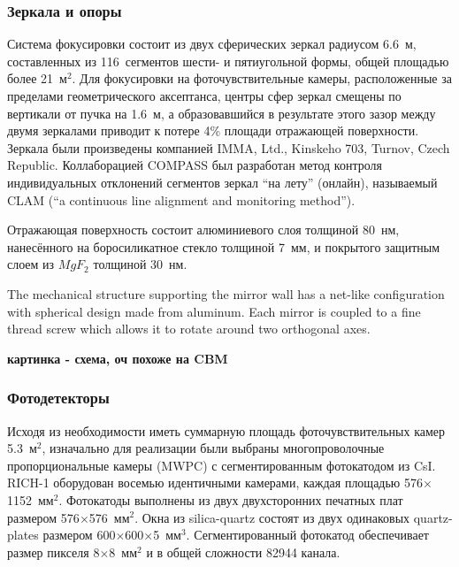 \subsubsection{Зеркала и опоры}

Система фокусировки состоит из двух сферических зеркал радиусом 6.6~м, составленных из 116~сегментов шести- и пятиугольной формы, общей площадью более 21~м$^2$. Для фокусировки на фоточувствительные камеры, расположенные за пределами геометрического аксептанса, центры сфер зеркал смещены по вертикали от пучка на 1.6~м, а образовавшийся в результате этого зазор между двумя зеркалами приводит к потере 4\% площади отражающей поверхности. Зеркала были произведены компанией IMMA, Ltd., Kinskeho 703, Turnov, Czech Republic.
Коллаборацией COMPASS был разработан метод контроля индивидуальных отклонений сегментов зеркал ``на лету'' (онлайн), называемый CLAM (``a continuous line alignment and monitoring method'').

Отражающая поверхность состоит алюминиевого слоя толщиной 80~нм, нанесённого на боросиликатное стекло толщиной 7~мм, и покрытого защитным слоем из $MgF_{2}$ толщиной 30~нм.

The mechanical structure supporting the mirror wall has a net-like configuration with spherical design made from aluminum. Each mirror is coupled to a fine thread screw which allows it to rotate around two orthogonal axes.

\todo \textbf{картинка - схема, оч похоже на CBM}

\subsubsection{Фотодетекторы}

Исходя из необходимости иметь суммарную площадь фоточувствительных камер 5.3~м$^2$, изначально для реализации были выбраны многопроволочные пропорциональные камеры (MWPC) с сегментированным фотокатодом из CsI. \mbox{RICH-1} оборудован восемью идентичными камерами, каждая площадью 576$\times$1152~мм$^2$. Фотокатоды выполнены из двух двухсторонних печатных плат размером 576$\times$576~мм$^2$. Окна из silica-quartz состоят из двух одинаковых quartz-plates размером 600$\times$600$\times$5~мм$^3$. Сегментированный фотокатод обеспечивает размер пикселя 8$\times$8~мм$^2$ и в общей сложности 82944 канала.

